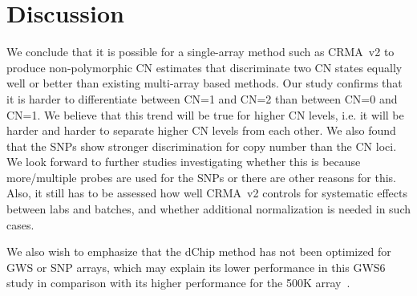 \documentclass{bioinfo}
\newcommand{\GWS}{GWS\xspace}
\newcommand{\GWSSix}{GWS6\xspace}
\begin{document}
\section{Discussion}
\label{secDiscussion}
We conclude that it is possible for a single-array method such as CRMA~v2 to produce non-polymorphic CN estimates that discriminate two CN states equally well or better than existing multi-array based methods.
Our study confirms that it is harder to differentiate between CN=1 and CN=2 than between CN=0 and CN=1.  We believe that this trend will be true for higher CN levels, i.e. it will be harder and harder to separate higher CN levels from each other.
We also found that the SNPs show stronger discrimination for copy number than the CN loci.
We look forward to further studies investigating whether this is because more/multiple probes are used for the SNPs or there are other reasons for this.
Also, it still has to be assessed how well CRMA~v2 controls for systematic effects between labs and batches, and whether additional normalization is needed in such cases.

We also wish to emphasize that the dChip method has not been optimized for \GWS or SNP arrays, which may explain its lower performance in this \GWSSix study in comparison with its higher performance for the 500K array~\citep{BengtssonH_etal_2008a}.


\end{document}
